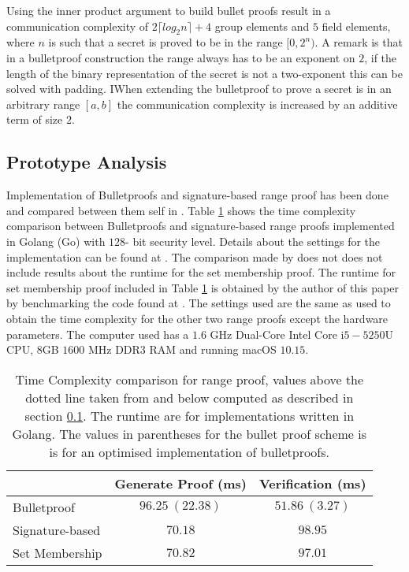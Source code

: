 Using the inner product argument to build bullet proofs result in a communication complexity of $2\lceil log_2 n \rceil +4$ group elements and $5$ field elements, where $n$ is such that a secret is proved to be in the range $[0,2^n)$.  A remark is that in a bulletproof construction the range always has to be an exponent on $2$, if the length of the binary representation of the secret is not a two-exponent this can be solved with padding. IWhen extending the bulletproof to prove a secret is in an arbitrary range $[a,b]$ the communication complexity is increased by an additive term of size $2$.  

\subsection{Prototype Analysis}
\label{sec:PrototypeAnalysis}
Implementation of Bulletproofs and signature-based range proof has been done  and compared between them self in \cite{RANGE-SET}. Table \ref{tab:runtime} shows the time complexity comparison between Bulletproofs and signature-based range proofs implemented in Golang (Go) with $128$- bit security level.  Details about the settings for the implementation can be found at \cite{RANGE-SET} \cite{Git:RP}. The comparison made by \cite{RANGE-SET} does not does not include results about the runtime for the set membership proof. The runtime for set membership proof included in Table \ref{tab:runtime} is obtained by the author of this paper by benchmarking the code found at \cite{Git:RP}. The settings used are the same as used to obtain the time complexity for the other two range proofs except the hardware parameters. The computer used has a $1.6$ GHz Dual-Core Intel Core i$5-5250$U CPU, $8$GB $1600$ MHz DDR3 RAM  and running macOS $10.15$. 




\begin{table}
	\centering
	\caption{Time Complexity comparison for range proof, values above the dotted line taken from \cite{RANGE-SET} and below 				computed as described in section \ref{sec:PrototypeAnalysis}. The runtime are for implementations written in Golang. The values in parentheses for the bullet proof scheme is is for an optimised implementation of bulletproofs. }
	\label{tab:runtime}
	\begin{tabular}[t]{ l c c }
			 \toprule
    									 		&Generate Proof (ms)	&		Verification  (ms)\\ \midrule		
  			Bulletproof   				&   $ 96.25 \: (22.38)$   & $ 51.86 \: (3.27)$ 	\\
    			Signature-based 		&   $ 70.18 $   				&	$98.95$  \\ \cdashline{1-3}
    			Set Membership 		&		$70.82$				&	$97.01$	\\
			\bottomrule		
	\end{tabular}
 \end{table}

